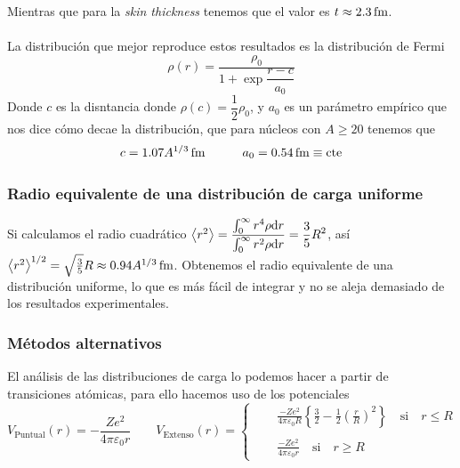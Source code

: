 \noindent Mientras que para la \textit{skin thickness} tenemos que el valor es $t\approx \unit[2.3]{fm}$.
\\\\
La distribución que mejor reproduce estos resultados es la distribución de Fermi
\begin{equation}
    \rho(r)=\dfrac{\rho_0}{1+\exp{\dfrac{r-c}{a_0}}}
    \label{eq: distribucion de Fermi}
\end{equation}
Donde $c$ es la disntancia donde $\rho(c)=\dfrac{1}{2} \rho_0$, y $a_0$ es un parámetro empírico que nos dice cómo decae la distribución, que para núcleos con $A\ge 20$ tenemos que 
\begin{equation*}
    c=\unit[1.07 A^{1/3}]{fm} \quad \quad \quad a_0=\unit[0.54]{fm}\equiv \text{cte}
\end{equation*}
\subsubsection{Radio equivalente de una distribución de carga uniforme}
Si calculamos el radio cuadrático $\expval{r^2}=\displaystyle  \dfrac{\int_0^\infty r^4 \rho \dd r}{\int_0^\infty r^2 \rho \dd r}=\dfrac{3}{5}R^2$, así $\expval{r^2}^{1/2}=\sqrt{\frac{3}{5}}R\approx \unit[0.94 A^{1/3}]{fm}$. Obtenemos el radio equivalente de una distribución uniforme, lo que es más fácil de integrar y no se aleja demasiado de los resultados experimentales.
\newpage

\subsubsection{Métodos alternativos}
El análisis de las distribuciones de carga lo podemos hacer a partir de transiciones atómicas, para ello hacemos uso de los potenciales
\begin{equation}
    V_\mathrm{Puntual}(r)=-\frac{Ze^2}{4\pi \varepsilon_0 r} \quad \quad V_\mathrm{Extenso}(r)= \left \{
\begin{aligned}
& \quad\frac{-Ze^2}{4\pi\varepsilon_0R}\left\{\frac{3}{2}-\frac{1}{2}{\left(\frac{r}{R}\right)}^2\right\} \quad \text{si} \quad r\le R \\\\
& \quad\frac{-Ze^2}{4\pi\varepsilon_0r} \quad \text{si} \quad r\ge R
\end{aligned} \right.
\label{eq: potenciales de transicion atomica}
\end{equation}

